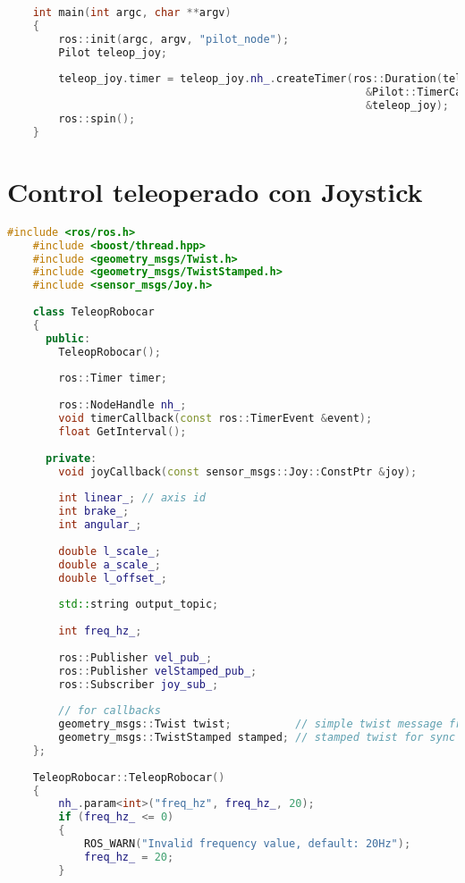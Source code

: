 \begin{lstlisting}[title={pilot\_node.cpp},language=c++]
    
    int main(int argc, char **argv)
    {
        ros::init(argc, argv, "pilot_node");
        Pilot teleop_joy;
    
        teleop_joy.timer = teleop_joy.nh_.createTimer(ros::Duration(teleop_joy.GetInterval()),
                                                        &Pilot::TimerCallback,
                                                        &teleop_joy);
        ros::spin();
    }
\end{lstlisting}

\section{Control teleoperado con Joystick}

\begin{lstlisting}[title={joy\_teleop.cpp},language=c++]
    #include <ros/ros.h>
    #include <boost/thread.hpp>
    #include <geometry_msgs/Twist.h>
    #include <geometry_msgs/TwistStamped.h>
    #include <sensor_msgs/Joy.h>
    
    class TeleopRobocar
    {
      public:
        TeleopRobocar();
    
        ros::Timer timer;
    
        ros::NodeHandle nh_;
        void timerCallback(const ros::TimerEvent &event);
        float GetInterval();
    
      private:
        void joyCallback(const sensor_msgs::Joy::ConstPtr &joy);
    
        int linear_; // axis id
        int brake_;
        int angular_;
    
        double l_scale_;
        double a_scale_;
        double l_offset_;
    
        std::string output_topic;
    
        int freq_hz_;
    
        ros::Publisher vel_pub_;
        ros::Publisher velStamped_pub_;
        ros::Subscriber joy_sub_;
    
        // for callbacks
        geometry_msgs::Twist twist;          // simple twist message from joystick
        geometry_msgs::TwistStamped stamped; // stamped twist for sync
    };
    
    TeleopRobocar::TeleopRobocar()
    {
        nh_.param<int>("freq_hz", freq_hz_, 20);
        if (freq_hz_ <= 0)
        {
            ROS_WARN("Invalid frequency value, default: 20Hz");
            freq_hz_ = 20;
        }
    

\end{lstlisting}
